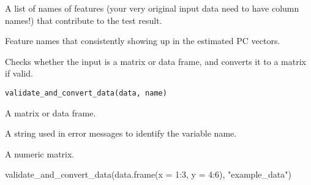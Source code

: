 \documentclass[a4paper]{book}
\begin{document}
%
\begin{Value}
A list of names of features (your very original input data need to have column names!) that contribute to the test result.

Feature names that consistently showing up in the estimated PC vectors.
\end{Value}
%
\begin{Description}
Checks whether the input is a matrix or data frame, and converts it to a matrix if valid.
\end{Description}
%
\begin{Usage}
\begin{verbatim}
validate_and_convert_data(data, name)
\end{verbatim}
\end{Usage}
%
\begin{Arguments}
\begin{ldescription}
\item[\code{data}] A matrix or data frame.

\item[\code{name}] A string used in error messages to identify the variable name.
\end{ldescription}
\end{Arguments}
%
\begin{Value}
A numeric matrix.
\end{Value}
%
\begin{Examples}
\begin{ExampleCode}
validate_and_convert_data(data.frame(x = 1:3, y = 4:6), "example_data")

\end{ExampleCode}
\end{Examples}
\printindex{}
\end{document}
